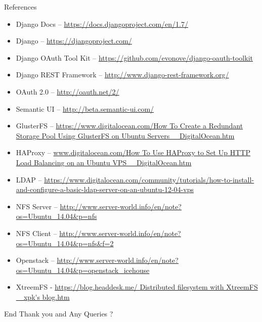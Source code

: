 \documentclass[10pt,xcolor=dvipsnames]{beamer}
\begin{document}
\begin{frame}[allowframebreaks]{References}
\small
\begin{itemize}
	\item Django Docs -- \url{https://docs.djangoproject.com/en/1.7/}
	\item Django -- \url{https://djangoproject.com/}
	\item Django OAuth Tool Kit -- \url{https://github.com/evonove/django-oauth-toolkit}
	\item Django REST Framework -- \url{http://www.django-rest-framework.org/}
	\item OAuth 2.0 -- \url{http://oauth.net/2/}
	\item Semantic UI -- \url{http://beta.semantic-ui.com/}
	\item GlusterFS -- \url{https://www.digitalocean.com/How To Create a Redundant Storage Pool Using GlusterFS on Ubuntu Servers _ DigitalOcean.htm}
	\item HAProxy -- \url{www.digitalocean.com/How To Use HAProxy to Set Up HTTP Load Balancing on an Ubuntu VPS _ DigitalOcean.htm}
	\item LDAP -- \url{https://www.digitalocean.com/community/tutorials/how-to-install-and-configure-a-basic-ldap-server-on-an-ubuntu-12-04-vps}
	\item NFS Server -- \url{http://www.server-world.info/en/note?os=Ubuntu_14.04&p=nfs}
	\item NFS Client -- \url{http://www.server-world.info/en/note?os=Ubuntu_14.04&p=nfs&f=2}
	\item Openstack -- \url{http://www.server-world.info/en/note?os=Ubuntu_14.04&p=openstack_icehouse}
\item XtreemFS - \url{https://blog.headdesk.me/ Distributed filesystem with XtreemFS _ xpk's blog.htm}
\end{itemize}
\end{frame}



\begin{frame}{End}
Thank you and Any Queries ?
\end{frame}
\end{document}

